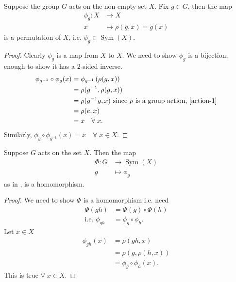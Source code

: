 \begin{lemma} \label{lem:16}
    Suppose the group $G$ acts on the non-empty set $X$.
    Fix $g \in G$, then the map
    \begin{align*}
        \phi_g : X &\to X \\
        x &\mapsto \rho(g, x) = g(x)
    \end{align*} is a permutation of $X$, i.e. $\phi_g \in \operatorname{Sym}(X)$.
\end{lemma} 

\begin{proof}
    Clearly $\phi_g$ is a map from $X$ to $X$.
    We need to show $\phi_g$ is a bijection, enough to show it has a 2-sided inverse.
    \begin{align*}
        \phi_{g^{-1}} \circ \phi_g (x) &= \phi_{g^{-1}} \left( \rho (g, x) \right) \\
        &= \rho(g^{-1}, \rho(g, x)) \\
        &= \rho(g^{-1} g, x) \text{ since $\rho$ is a group action, \Cref{action-1}} \\
        &= \rho(e, x) \\
        &= x \quad \forall \; x.
    \end{align*} 
    Similarly, $\phi_g \circ \phi_{g^{-1}}(x) = x \quad \forall \; x \in X$.
\end{proof} 

\begin{proposition} \label{prp:6}
    Suppose $G$ acts on the set $X$.
    Then the map 
    \begin{align*}
        \Phi : G &\to \operatorname{Sym}(X) \\
        g &\mapsto \phi_g
    \end{align*} as in , is a homomorphism.
\end{proposition}  

\begin{proof}
    We need to show $\Phi$ is a homomorphism i.e. need
    \begin{align*}
        \Phi(gh) &= \Phi(g) \circ \Phi(h) \\
        \text{i.e. } \phi_{gh} &= \phi_g \circ \phi_h.
    \end{align*}  
    Let $x \in X$
    \begin{align*}
        \phi_{gh}(x) &= \rho(gh, x) \\
        &= \rho(g, \rho(h, x)) \\
        &= \phi_g \circ \phi_h (x).
    \end{align*} 
    This is true $\forall \; x \in X$.
\end{proof} 

